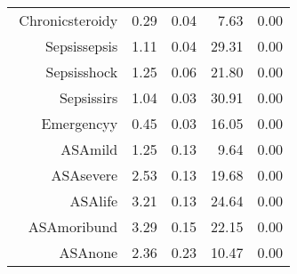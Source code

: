 \begin{tabular}{rrrrr}
$$  Chronic\-steroid\-y & 0.29 & 0.04 & 7.63 & 0.00 \\ 
  Sepsis\-sepsis & 1.11 & 0.04 & 29.31 & 0.00 \\ 
  Sepsis\-shock & 1.25 & 0.06 & 21.80 & 0.00 \\ 
  Sepsis\-sirs & 1.04 & 0.03 & 30.91 & 0.00 \\ 
  Emergency\-y & 0.45 & 0.03 & 16.05 & 0.00 \\ 
  ASA\-mild & 1.25 & 0.13 & 9.64 & 0.00 \\ 
  ASA\-severe & 2.53 & 0.13 & 19.68 & 0.00 \\ 
  ASA\-life & 3.21 & 0.13 & 24.64 & 0.00 \\ 
  ASA\-moribund & 3.29 & 0.15 & 22.15 & 0.00 \\ 
  ASA\-none & 2.36 & 0.23 & 10.47 & 0.00 \\ 
   \hline
\end{tabular}

